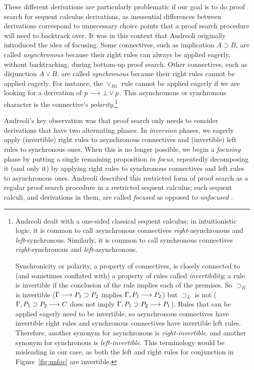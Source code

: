 \documentclass[acmtocl]{robtrans}\pdfoutput=1
\newcommand{\seq}[2]{{#1} \longrightarrow {#2} \mathstrut}
\begin{document}
These different derivations are particularly problematic if our goal
is to do proof search for sequent calculus derivations, as inessential
differences between derivations correspond to unnecessary choice
points that a proof search procedure will need to backtrack over.  It
was in this context that Andreoli originally introduced the idea of
focusing. Some connectives, such as implication $A \supset B$, are
called {\it asynchronous} because their right rules can always be
applied eagerly, without backtracking, during bottom-up proof
search. Other connectives, such as disjunction $A \vee B$, are called
{\it synchronous} because their right rules cannot be applied
eagerly. For instance, the $\vee_{R1}$ rule cannot be applied eagerly
if we are looking for a derivation of $\seq{p}{\bot \vee p}$. 
This 
asynchronous or synchronous character is the connective's {\it
  polarity}.\footnote{Andreoli dealt with a one-sided classical sequent
  calculus; in intuitionistic logic, it is common to call asynchronous
  connectives {\it right}-asynchronous and {\it
    left}-synchronous. Similarly, it is common to call synchronous
  connectives {\it right}-synchronous and {\it left}-asynchronous.

  Synchronicity or polarity, a property of connectives, is closely
  connected to (and sometimes conflated with) a property of rules
  called {\it invertibility}; a rule is invertible if the conclusion
  of the rule implies each of the premises. So $\supset_R$ is
  invertible ($\seq{\Gamma}{P_1 \supset P_2}$ implies $\seq{\Gamma,
    P_1}{P_2}$) but $\supset_L$ is not ($\seq{\Gamma, P_1 \supset
    P_2}{C}$ does not imply $\seq{\Gamma, P_1 \supset P_2}{P_1}$).
  Rules that can be applied eagerly need to be invertible, so
  asynchronous connectives have invertible right rules and synchronous
  connectives have invertible left rules. Therefore, another synonym
  for asynchronous is {\it right-invertible}, and another synonym for
  synchronous is {\it left-invertible}. This terminology would be
  misleading in our case, as both the left and right rules for
  conjunction in Figure~\ref{fig:unfoc} are invertible.}

Andreoli's key observation was that proof search only needs to
consider derivations that have two alternating phases.  In {\it
  inversion} phases, we eagerly apply (invertible) right rules to
asynchronous connectives and (invertible) left rules to synchronous
ones. When this is no longer possible, we begin a {\it focusing} phase
by putting a single remaining proposition {\it in focus}, repeatedly
decomposing it (and only it) by applying right rules to synchronous
connectives and left rules to asynchronous ones. Andreoli described
this restricted form of proof search as a regular proof search
procedure in a restricted sequent calculus; such sequent calculi, and
derivations in them, are called {\it focused} as opposed to {\it
  unfocused} \cite{andreoli92logic}.
\end{document}
